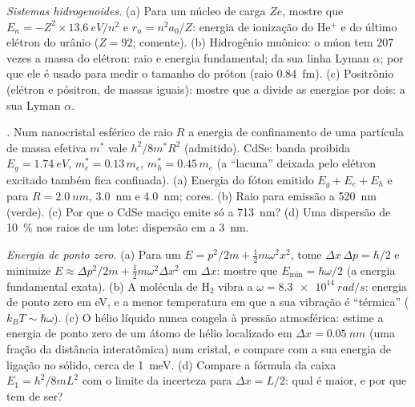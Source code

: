 \begin{exercise}[$\star\star\star$]\label{exo:b1:quantum-introduction:10}
\emph{Sistemas hidrogenoides.} (a) Para um núcleo de carga $Ze$, mostre que
$E_n = -Z^2 \times \qty{13.6}{eV}/n^2$ e $r_n = n^2a_0/Z$: energia de ionização
do He$^+$ e do último elétron do urânio ($Z = 92$; comente).
(b) Hidrogênio muônico: o múon tem $207$ vezes a massa do elétron:
raio e energia fundamental;  da sua linha Lyman $\alpha$; por que ele
é usado para medir o tamanho do próton (raio \qty{0.84}{fm}).
(c) Positrônio (elétron e pósitron, de massas iguais): mostre que a
 divide as energias por dois: a sua Lyman $\alpha$.
\end{exercise}

\begin{exercise}[$\star\star\star$]\label{exo:b1:quantum-introduction:11}
\emph{.} Num nanocristal esférico de raio $R$ a
energia de confinamento de uma partícula de massa efetiva $m^\ast$ vale
$h^2/8m^\ast R^2$ (admitido). CdSe: banda proibida $E_g = \qty{1.74}{eV}$, $m_e^\ast =
0.13\,m_e$, $m_h^\ast = 0.45\,m_e$ (a ``lacuna'' deixada pelo elétron excitado
também fica confinada). (a) Energia do fóton emitido $E_g + E_e + E_h$
e  para $R = \qty{2.0}{nm}$, \qty{3.0}{nm} e \qty{4.0}{nm}; cores.
(b) Raio para emissão a \qty{520}{nm} (verde). (c) Por que o CdSe maciço
emite só a \qty{713}{nm}? (d) Uma dispersão de \qty{10}{\percent} nos raios de um
lote: dispersão em  a \qty{3}{nm}.
\end{exercise}

\begin{exercise}[$\star\star\star$]\label{exo:b1:quantum-introduction:12}
\emph{Energia de ponto zero.} (a) Para um  $E = p^2/2m +
\tfrac12m\omega^2x^2$, tome $\Delta x\,\Delta p = \hbar/2$ e minimize $E \approx
\Delta p^2/2m + \tfrac12m\omega^2\Delta x^2$ em $\Delta x$: mostre que $E_{\min} = \hbar\omega/2$
(a energia fundamental exata). (b) A molécula de H$_2$ vibra a $\omega =
\qty{8.3e14}{rad/s}$: energia de ponto zero em eV, e a menor
temperatura em que a sua vibração é ``térmica'' ($k_BT \sim \hbar\omega$).
(c) O hélio líquido nunca congela à pressão atmosférica: estime a
energia de ponto zero de um átomo de hélio localizado em $\Delta x = \qty{0.05}{nm}$
(uma fração da distância interatômica) num cristal, e compare com a
sua energia de ligação no sólido, cerca de \qty{1}{meV}. (d) Compare a fórmula da caixa $E_1 = h^2/8mL^2$ com o
limite da incerteza para $\Delta x = L/2$: qual é maior, e por que tem de ser?
\end{exercise}

